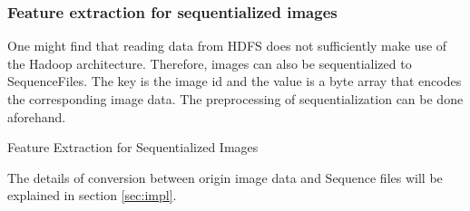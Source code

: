 \documentclass{acm_proc_article-sp}
\begin{document}
\subsubsection{Feature extraction for sequentialized images} One might find that reading data from HDFS does not sufficiently make use of the Hadoop architecture.
Therefore, images can also be sequentialized to SequenceFiles. The key is the image id and the value is a byte array that encodes the corresponding image data.
The preprocessing of sequentialization can be done aforehand. 
\begin{algorithm}[!htb]
\SetAlgoVlined
{}
\caption{Feature Extraction for Sequentialized Images}
\end{algorithm}
The details of conversion between origin image data and Sequence files will be explained in section \ref{sec:impl}.
\end{document}
